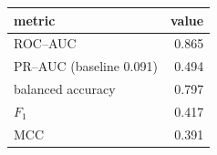 \begin{tabular}{lr}
\toprule
metric & value \\
\midrule
ROC--AUC & 0.865 \\
PR--AUC (baseline 0.091) & 0.494 \\
balanced accuracy & 0.797 \\
$F_1$ & 0.417 \\
MCC & 0.391 \\
\bottomrule
\end{tabular}
